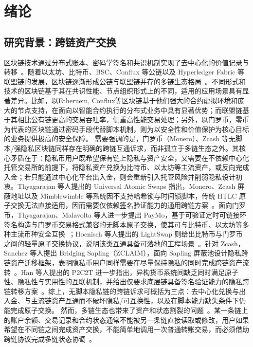 
\chapter{绪论}

\section{研究背景：跨链资产交换}

区块链技术通过分布式账本、密码学签名和共识机制实现了去中心化的价值记录与转移~\cite{nakamoto2008bitcoin,zheng2018blockchain}。随着以太坊、比特币、BSC、Conflux 等公链以及 Hyperledger Fabric 等联盟链的发展，区块链逐渐形成公链与联盟链并存的多链生态格局~\cite{lohachab2021towards}。不同形式和技术的区块链基于其在共识性能、节点组织形式上的不同，适用的应用场景具有显著差异。比如，以Etheruem, Conflux等区块链基于他们强大的合约虚拟环境和庞大的节点支持，在面向以智能合约执行的分布式业务中具有显著优势；而联盟链基于其相比公有链更高的交易吞吐率，侧重高性能交易处理；另外，以门罗币，零币为代表的区块链通过密码手段代替脚本机制，则为以安全性和价值保护为核心目标的业务提供极高的安全保障。
需要强调的是，门罗币（Monero）、Zcash 等无脚本/强隐私区块链同样存在明确的跨链互通诉求，而非孤立于多链生态之外。其核心矛盾在于：隐私币用户既希望保有链上隐私与资产安全，又需要在不依赖中心化托管交易所的前提下，将隐私资产兑换为比特币、以太坊等主流资产，或反向完成入金；若只能通过中心化平台出入金，则会重新引入托管风险并削弱隐私设计初衷。Thyagarajan 等人提出的 Universal Atomic Swaps 指出，Monero、Zcash 屏蔽地址以及 Mimblewimble 等系统因不支持哈希锁与时间锁脚本，传统 HTLC 原子交换无法直接适用，因而需要仅依赖签名验证能力的通用跨链方案~\cite{thyagarajan2022universal}。面向门罗币，Thyagarajan、Malavolta 等人进一步提出 PayMo，基于可验证定时可链接环签名构造与门罗币交易格式兼容的无脚本原子交换，使其可与比特币、以太坊等多种主流币种安全互换~\cite{thyagarajan2022paymo}；Hoenisch 等人提出的 LightSwap 则给出比特币与门罗币之间的轻量原子交换协议，说明该类互通具备可落地的工程场景~\cite{hoenisch2022lightswap}。针对 Zcash，Sanchez 等人提出 Bridging Sapling（ZCLAIM），面向 Sapling 屏蔽池设计隐私跨链资产迁移框架，表明隐私币用户同样需要在尽量保持隐私的同时完成跨链资产流转~\cite{sanchez2022zclaim}。Han 等人提出的 P2C2T 进一步指出，异构货币系统间缺乏同时满足原子性、隐私性与实用性的互联机制，并给出仅要求底层链具备签名验证能力的隐私跨链转移方案~\cite{han2025p2c2t}。综上，无脚本隐私链的跨链诉求可概括为三点：去中心化兑换与出入金、与主流链资产互通而不破坏隐私/可互换性，以及在脚本能力缺失条件下仍能完成原子交换。
然而，多链生态也带来了资产和状态割裂的问题~\cite{JSGG202402003}。某一条链上的账户余额、交易记录和合约状态通常不能被另一条链直接读取或修改，用户如果希望在不同链之间完成资产交换，不能简单地调用一次普通转账交易，而必须借助跨链协议完成多链状态协调~\cite{zamyatin2021sok}。

